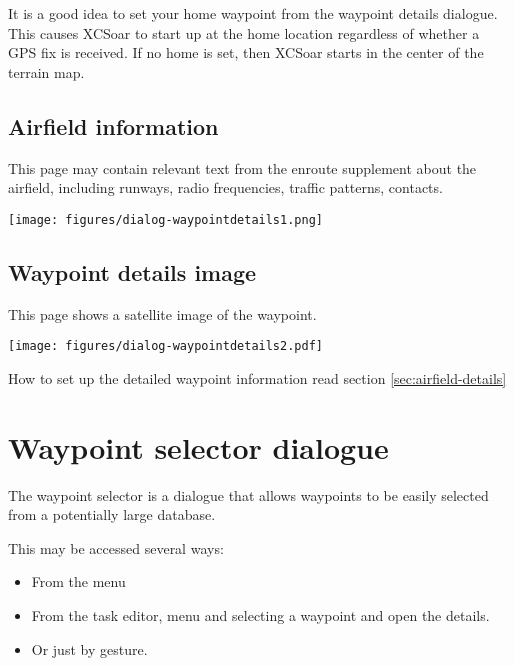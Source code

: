 It is a good idea to set your home waypoint from the waypoint details
dialogue. This causes XCSoar to start up at the home location regardless
of whether a GPS fix is received.  If no home is set, then XCSoar
starts in the center of the terrain map.

\subsection*{Airfield information}
This page may contain relevant text from the enroute supplement about
the airfield, including runways, radio frequencies, traffic patterns,
contacts.
\begin{center}
\texttt{[image: figures/dialog-waypointdetails1.png]}
\end{center}

\subsection*{Waypoint details image}
This page shows a satellite image of the waypoint.

\begin{center}
\texttt{[image: figures/dialog-waypointdetails2.pdf]}
\end{center}
How to set up the detailed waypoint information read section \ref{sec:airfield-details}

\section{Waypoint selector dialogue}\label{sec:waypoint-selector-dialog}
The waypoint selector is a dialogue that allows waypoints to be easily selected
from a potentially large database.

This may be accessed several ways:
\begin{itemize}
\item  From the menu \blink{}
\item  From the task editor, menu \blink{} 
  and selecting a waypoint and open the details.
\item  Or just by gesture.
\end{itemize}


